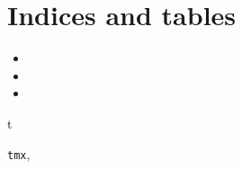 \documentclass[letterpaper,10pt,english]{sphinxmanual}
\begin{document}
\chapter{Indices and tables}
\label{index:indices-and-tables}\begin{itemize}
\item {} 

\item {} 

\item {} 

\end{itemize}


\renewcommand{\indexname}{Python Module Index}
\begin{theindex}
\def\bigletter#1{{\Large\sffamily#1}\nopagebreak\vspace{1mm}}
\bigletter{t}
\item {\texttt{tmx}}, \pageref{index:module-tmx}
\end{theindex}

\renewcommand{\indexname}{Index}
\printindex
\end{document}
